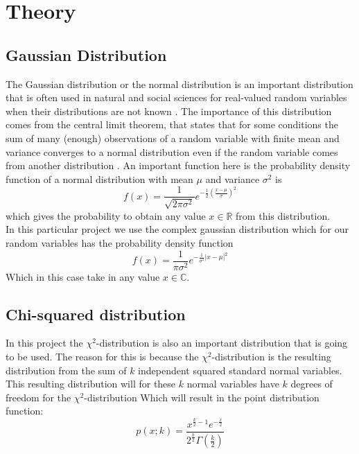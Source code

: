 \section{Theory}\label{sec:theory}
\subsection{Gaussian Distribution}
The Gaussian distribution or the normal distribution is an important distribution that is often used in natural and social sciences for real-valued random variables when their distributions are not known \cite{WikipediaGaussian}. The importance of this distribution comes from the central limit theorem, that states that for some conditions the sum of many (enough) observations of a random variable with finite mean and variance converges to a normal distribution even if the random variable comes from another distribution  \cite{WikipediaCLT}. An important function here is the probability density function of a normal distribution with mean $\mu$ and variance $\sigma^2$ is
\begin{equation}
	f(x) = \frac{1}{\sqrt{2\pi\sigma^2}}e^{-\frac{1}{2}(\frac{x-\mu}{\sigma})^2}
\end{equation}
which gives the probability to obtain any value $x\in\mathbb{R}$ from this distribution.\\
In this particular project we use the complex gaussian distribution which for our random variables has the probability density function
\begin{equation}
	f(x) = \frac{1}{\pi\sigma^2}e^{-\frac{1}{\sigma^2}|x-\mu|^2}
\end{equation}
Which in this case take in any value $x\in\mathbb{C}$.

\subsection{Chi-squared distribution}
In this project the $\chi^2$-distribution is also an important distribution that is going to be used. The reason for this is because the $\chi^2$-distribution is the resulting distribution from the sum of $k$ independent squared standard normal variables. This resulting distribution will for these $k$ normal variables have $k$ degrees of freedom for the $\chi^2$-distribution \cite{WikipediaChi} Which will result in the point distribution function:
\begin{equation}
    p(x; k) = \frac{x^{\frac{k}{2}-1}e^{-\frac{x}{2}}}{2^{\frac{k}{2}}\Gamma(\frac{k}{2})}
\end{equation}

